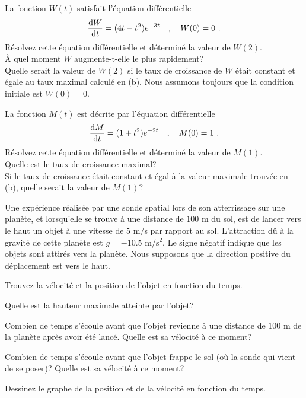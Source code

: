 \begin{question}
La fonction $W(t)$ satisfait l'équation différentielle
\[
\frac{\mathrm{d}W}{\mathrm{d}t} = (4t-t^2) e^{-3t} \quad , \quad  W(0) = 0 \ .
\]
 Résolvez cette équation différentielle et déterminé la valeur
de $W(2)$.\\
 À quel moment $W$ augmente-t-elle le plus rapidement?\\
 Quelle serait la valeur de $W(2)$ si le taux de croissance de
$W$ était constant et égale au taux maximal calculé en (b).  Nous assumons
toujours que la condition initiale est $W(0) = 0$.
\label{10Q12}
\end{question}

\begin{question}
La fonction $M(t)$ est décrite par l'équation différentielle
\[
\frac{\mathrm{d}M}{\mathrm{d}t} = (1+t^2) e^{-2t} \quad , \quad M(0) = 1 \ .
\]
 Résolvez cette équation différentielle et déterminé la valeur
de $M(1)$.\\
 Quelle est le taux de croissance maximal?\\
 Si le taux de croissance était constant et égal à la
valeur maximale trouvée en (b), quelle serait la valeur de $M(1)$?
\label{10Q13}
\end{question}

\begin{question}
Une expérience réalisée par une sonde spatial lors de son atterrissage sur
une planète, et lorsqu'elle se trouve à une distance de $100$ m du sol, est
de lancer vers le haut un objet à une vitesse de $5$ m/s par rapport au sol.
L'attraction dû à la gravité de cette planète est $g= -10.5$  m/s$^2$.  Le
signe négatif indique que les objets sont attirés vers la planète.  Nous
supposons que la direction positive du déplacement est vers le haut.

 Trouvez la vélocité et la position de l'objet en fonction du temps.

 Quelle est la hauteur maximale atteinte par l'objet?

 Combien de temps s'écoule avant que l'objet revienne à une distance
de $100$ m de la planète après avoir été lancé.  Quelle est sa vélocité à ce
moment?

 Combien de temps s'écoule avant que l'objet frappe le sol (où la
sonde qui vient de se poser)?  Quelle est sa vélocité à ce moment?

 Dessinez le graphe de la position et de la vélocité en fonction du
temps.
\label{10Q14}
\end{question}

